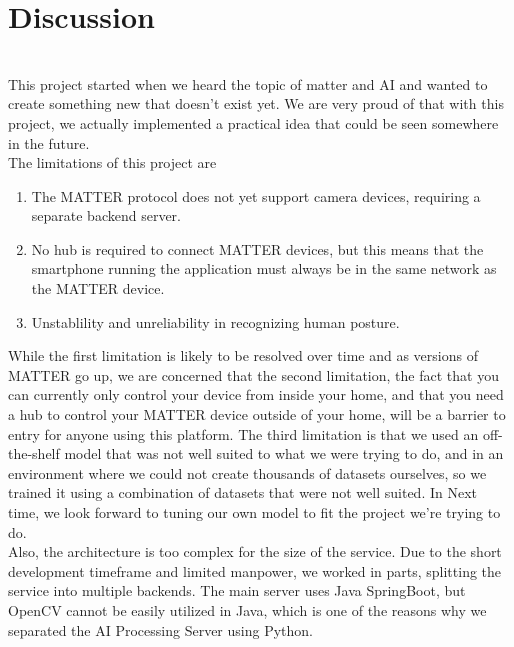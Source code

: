 

\clearpage
\section{\Large{Discussion}}\\

This project started when we heard the topic of matter and AI and wanted to create something new that doesn't exist yet. We are very proud of that with this project, we actually implemented a practical idea that could be seen somewhere in the future. \\

The limitations of this project are
\begin{enumerate}
    \item The MATTER protocol does not yet support camera devices, requiring a separate backend server.\\
    \item No hub is required to connect MATTER devices, but this means that the smartphone running the application must always be in the same network as the MATTER device. \\
    \item Unstablility and unreliability in recognizing human posture.\\
\end{enumerate}

While the first limitation is likely to be resolved over time and as versions of MATTER go up, we are concerned that the second limitation, the fact that you can currently only control your device from inside your home, and that you need a hub to control your MATTER device outside of your home, will be a barrier to entry for anyone using this platform. The third limitation is that we used an off-the-shelf model that was not well suited to what we were trying to do, and in an environment where we could not create thousands of datasets ourselves, so we trained it using a combination of datasets that were not well suited. In Next time, we look forward to tuning our own model to fit the project we're trying to do.\\

Also, the architecture is too complex for the size of the service. Due to the short development timeframe and limited manpower, we worked in parts, splitting the service into multiple backends. The main server uses Java SpringBoot, but OpenCV cannot be easily utilized in Java, which is one of the reasons why we separated the AI Processing Server using Python.\\

